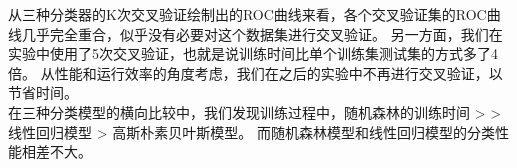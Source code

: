 从三种分类器的K次交叉验证绘制出的ROC曲线来看，各个交叉验证集的ROC曲线几乎完全重合，似乎没有必要对这个数据集进行交叉验证。
另一方面，我们在实验中使用了5次交叉验证，也就是说训练时间比单个训练集测试集的方式多了4倍。
从性能和运行效率的角度考虑，我们在之后的实验中不再进行交叉验证，以节省时间。\\
在三种分类模型的横向比较中，我们发现训练过程中，随机森林的训练时间 > > 线性回归模型 > 高斯朴素贝叶斯模型。
而随机森林模型和线性回归模型的分类性能相差不大。

